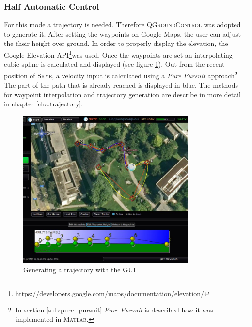 \subsubsection{Half Automatic Control}
\label{subsub:halfautomaticcontrol}
For this mode a trajectory is needed. Therefore \textsc{QGroundControl} was adopted to generate it. After setting the waypoints on Google Maps, the user can adjust the their height over ground. In order to properly display the elevation, the Google Elevation API\footnote{\url{https://developers.google.com/maps/documentation/elevation/}}was used. Once the waypoints are set an interpolating cubic spline is calculated and displayed (see figure \ref{fig:qgc_automatic_control}). Out from the recent position of \textsc{Skye}, a velocity input is calculated using a \textit{Pure Pursuit} approach\footnote{In section \ref{sub:pure_pursuit} \textit{Pure Pursuit} is described how it was implemented in \textsc{Matlab}.} The part of the path that is already reached is displayed in blue. The methods for waypoint interpolation and trajectory generation are describe in more detail in chapter \ref{cha:trajectory}.%

\begin{figure}[H] %
	\begin{center}
		\includegraphics[width=0.8\textwidth]{qgc_automatic_control}
		\caption{Generating a trajectory with the GUI}
		\label{fig:qgc_automatic_control}		
	\end{center}
\end{figure}


